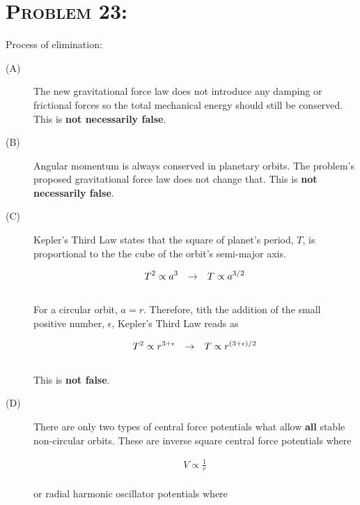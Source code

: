 \documentclass{article}
\begin{document}

\section{\textsc{Problem 23:}} Process of elimination:

\begin{description}

\item[(A)] The new gravitational force law does not introduce any damping or frictional forces so the total mechanical energy should still be conserved. This is \textbf{not necessarily false}.

\item[(B)] Angular momentum is always conserved in planetary orbits. The problem's proposed gravitational force law does not change that. This is \textbf{not necessarily false}.

\item[(C)] Kepler's Third Law states that the square of planet's period, $T$, is proportional to the the cube of the orbit's semi-major axis. 

\begin{gather}
T^{2} \propto a^{3} \hspace{.1in} \rightarrow \hspace{.1in} T \propto a^{3/2}
\end{gather}
\\
For a circular orbit, $a = r$. Therefore, tith the addition of the small positive number, $\epsilon$, Kepler's Third Law reads as

\begin{gather}
T^{2} \propto r^{3 + \epsilon} \hspace{.1in} \rightarrow \hspace{.1in} T \propto r^{(3 + \epsilon)/2}\nonumber
\end{gather}
\\
This is \textbf{not false}.

\item[(D)] There are only two types of central force potentials what allow \textbf{all} stable non-circular orbits. These are inverse square central force potentials where

\begin{gather}
V \propto \frac{1}{r}\nonumber
\end{gather}
\\
or radial harmonic oscillator potentials where


\end{description}
\end{document}
